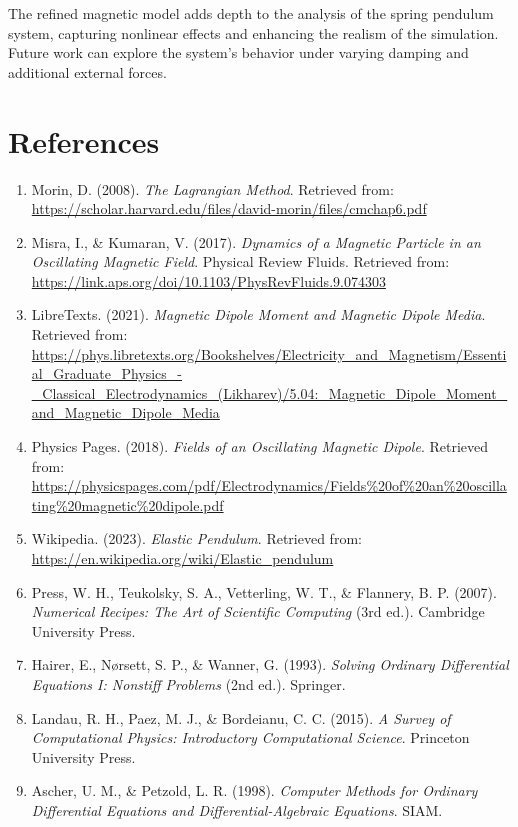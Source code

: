 \documentclass[12pt]{article}
\begin{document}
The refined magnetic model adds depth to the analysis of the spring pendulum system, capturing nonlinear effects and enhancing the realism of the simulation. Future work can explore the system's behavior under varying damping and additional external forces.

\newpage

\section*{References}
\begin{enumerate}
    \item Morin, D. (2008). \textit{The Lagrangian Method}. Retrieved from: \url{https://scholar.harvard.edu/files/david-morin/files/cmchap6.pdf}
    \item Misra, I., \& Kumaran, V. (2017). \textit{Dynamics of a Magnetic Particle in an Oscillating Magnetic Field}. Physical Review Fluids. Retrieved from: \url{https://link.aps.org/doi/10.1103/PhysRevFluids.9.074303}
    \item LibreTexts. (2021). \textit{Magnetic Dipole Moment and Magnetic Dipole Media}. Retrieved from: \url{https://phys.libretexts.org/Bookshelves/Electricity_and_Magnetism/Essential_Graduate_Physics_-_Classical_Electrodynamics_(Likharev)/5.04:_Magnetic_Dipole_Moment_and_Magnetic_Dipole_Media}
    \item Physics Pages. (2018). \textit{Fields of an Oscillating Magnetic Dipole}. Retrieved from: \url{https://physicspages.com/pdf/Electrodynamics/Fields%20of%20an%20oscillating%20magnetic%20dipole.pdf}
    \item Wikipedia. (2023). \textit{Elastic Pendulum}. Retrieved from: \url{https://en.wikipedia.org/wiki/Elastic_pendulum}
    \item Press, W. H., Teukolsky, S. A., Vetterling, W. T., \& Flannery, B. P. (2007). \textit{Numerical Recipes: The Art of Scientific Computing} (3rd ed.). Cambridge University Press.
    \item Hairer, E., Nørsett, S. P., \& Wanner, G. (1993). \textit{Solving Ordinary Differential Equations I: Nonstiff Problems} (2nd ed.). Springer.
    \item Landau, R. H., Paez, M. J., \& Bordeianu, C. C. (2015). \textit{A Survey of Computational Physics: Introductory Computational Science}. Princeton University Press.
    \item Ascher, U. M., \& Petzold, L. R. (1998). \textit{Computer Methods for Ordinary Differential Equations and Differential-Algebraic Equations}. SIAM.

\end{enumerate}
\end{document}
